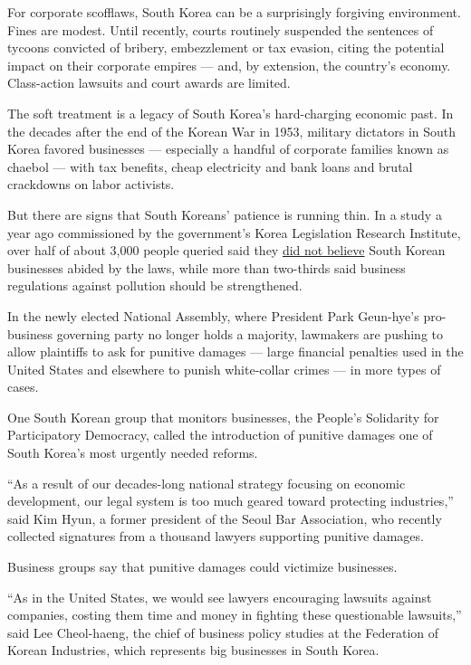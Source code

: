 For corporate scofflaws, South Korea can be a surprisingly forgiving
environment. Fines are modest. Until recently, courts routinely
suspended the sentences of tycoons convicted of bribery, embezzlement or
tax evasion, citing the potential impact on their corporate empires ---
and, by extension, the country's economy. Class-action lawsuits and
court awards are limited.

The soft treatment is a legacy of South Korea's hard-charging economic
past. In the decades after the end of the Korean War in 1953, military
dictators in South Korea favored businesses --- especially a handful of
corporate families known as chaebol --- with tax benefits, cheap
electricity and bank loans and brutal crackdowns on labor activists.

But there are signs that South Koreans' patience is running thin. In a
study a year ago commissioned by the government's Korea Legislation
Research Institute, over half of about 3,000 people queried said they
\href{http://www.koreatimes.co.kr/www/news/nation/2016/04/116_201742.html}{did
not believe} South Korean businesses abided by the laws, while more than
two-thirds said business regulations against pollution should be
strengthened.

In the newly elected National Assembly, where President Park Geun-hye's
pro-business governing party no longer holds a majority, lawmakers are
pushing to allow plaintiffs to ask for punitive damages --- large
financial penalties used in the United States and elsewhere to punish
white-collar crimes --- in more types of cases.

One South Korean group that monitors businesses, the People's Solidarity
for Participatory Democracy, called the introduction of punitive damages
one of South Korea's most urgently needed reforms.

``As a result of our decades-long national strategy focusing on economic
development, our legal system is too much geared toward protecting
industries,'' said Kim Hyun, a former president of the Seoul Bar
Association, who recently collected signatures from a thousand lawyers
supporting punitive damages.

Business groups say that punitive damages could victimize businesses.

``As in the United States, we would see lawyers encouraging lawsuits
against companies, costing them time and money in fighting these
questionable lawsuits,'' said Lee Cheol-haeng, the chief of business
policy studies at the Federation of Korean Industries, which represents
big businesses in South Korea.


